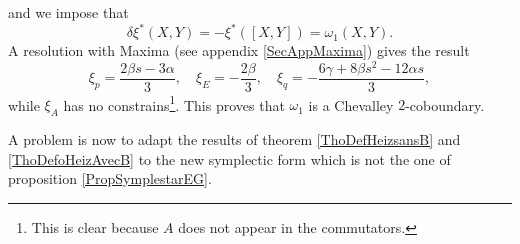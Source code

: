 and we impose that
\begin{equation}
  \delta\xi^*(X,Y)=-\xi^*([X,Y])=\omega_{1}(X,Y).
\end{equation}
A resolution with Maxima (see appendix \ref{SecAppMaxima}) gives the result
\begin{equation}  \label{EqSolxialgun}
\xi_{p}=\frac{ 2\beta s-3\alpha }{ 3 },\quad\xi_{E}=-\frac{ 2\beta }{ 3 },\quad\xi_{q}=-\frac{ 6\gamma+8 \beta s^{2}-12\alpha s }{ 3 },
\end{equation}
while $\xi_{A}$ has no constrains\footnote{This is clear because $A$ does not appear in the commutators.}. This proves that $\omega_{1}$ is a Chevalley $2$-coboundary.

A problem is now to adapt the results of theorem \ref{ThoDefHeizsansB} and \ref{ThoDefoHeizAvecB} to the new symplectic form which is not the one of proposition \ref{PropSymplestarEG}. 


